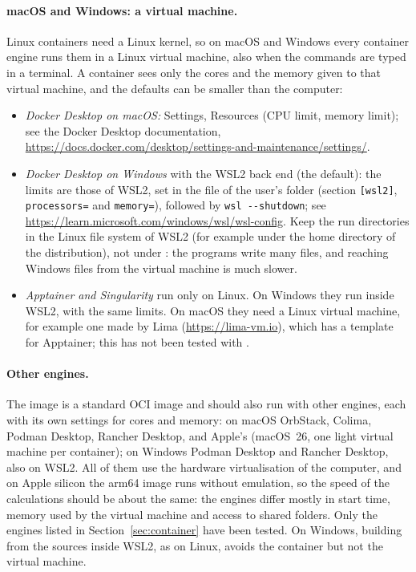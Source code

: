 \paragraph{macOS and Windows: a virtual machine.} Linux containers need a
Linux kernel, so on macOS and Windows every container engine runs them in
a Linux virtual machine, also when the commands are typed in a terminal.
A container sees only the cores and the memory given to that virtual
machine, and the defaults can be smaller than the computer:
\begin{itemize}
\item \emph{Docker Desktop on macOS:} Settings, Resources (CPU limit,
  memory limit); see the Docker Desktop documentation,
  \url{https://docs.docker.com/desktop/settings-and-maintenance/settings/}.
\item \emph{Docker Desktop on Windows} with the WSL2 back end (the
  default): the limits are those of WSL2, set in the file
   of the user's folder (section \texttt{[wsl2]},
  \texttt{processors=} and \texttt{memory=}), followed by
  \texttt{wsl -{}-shutdown}; see
  \url{https://learn.microsoft.com/windows/wsl/wsl-config}. Keep the run
  directories in the Linux file system of WSL2 (for example under the
  home directory of the distribution), not under : the
  programs write many files, and reaching Windows files from the
  virtual machine is much slower.
\item \emph{Apptainer and Singularity} run only on Linux. On Windows they
  run inside WSL2, with the same limits. On macOS they need a Linux
  virtual machine, for example one made by Lima
  (\url{https://lima-vm.io}), which has a template for Apptainer; this
  has not been tested with \ac{}.
\end{itemize}

\paragraph{Other engines.} The image is a standard OCI image and should
also run with other engines, each with its own settings for cores and
memory: on macOS OrbStack, Colima, Podman Desktop, Rancher Desktop, and
Apple's  (macOS~26, one light virtual machine per
container); on Windows Podman Desktop and Rancher Desktop, also on WSL2.
All of them use the hardware virtualisation of the computer, and on Apple
silicon the arm64 image runs without emulation, so the speed of the
calculations should be about the same: the engines differ mostly in start
time, memory used by the virtual machine and access to shared folders.
Only the engines listed in Section~\ref{sec:container} have been tested.
On Windows, building \ac{} from the sources inside WSL2, as on Linux,
avoids the container but not the virtual machine.

